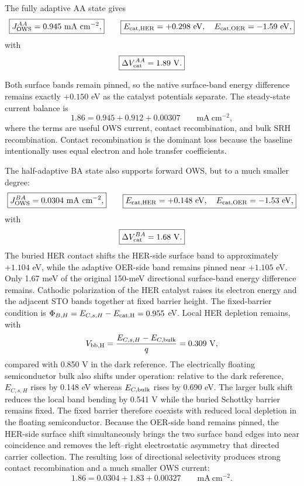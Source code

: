 \documentclass[11pt]{article}
\begin{document}
The fully adaptive AA state gives
\begin{equation}
\boxed{J_{\rm OWS}^{AA}=0.945~\mathrm{mA~cm^{-2}},}\qquad
\boxed{E_{\rm cat,HER}=+0.298~\mathrm{eV},\quad E_{\rm cat,OER}=-1.59~\mathrm{eV},}
\end{equation}
with
\begin{equation}
\boxed{\Delta V_{\rm cat}^{AA}=1.89~\mathrm V.}
\end{equation}


Both surface bands remain pinned, so the native surface-band energy difference remains exactly $+0.150$ eV as the catalyst potentials separate. The steady-state current balance is
\begin{equation}
1.86=0.945+0.912+0.00307
\qquad \mathrm{mA~cm^{-2}},
\label{eq:aa-balance}
\end{equation}
where the terms are useful OWS current, contact recombination, and bulk SRH recombination. Contact recombination is the dominant loss because the baseline intentionally uses equal electron and hole transfer coefficients.

The half-adaptive BA state also supports forward OWS, but to a much smaller degree:
\begin{equation}
\boxed{J_{\rm OWS}^{BA}=0.0304~\mathrm{mA~cm^{-2}},}\qquad
\boxed{E_{\rm cat,HER}=+0.148~\mathrm{eV},\quad E_{\rm cat,OER}=-1.53~\mathrm{eV},}
\end{equation}
with
\begin{equation}
\boxed{\Delta V_{\rm cat}^{BA}=1.68~\mathrm V.}
\end{equation}
The buried HER contact shifts the HER-side surface band to approximately $+1.104$ eV, while the adaptive OER-side band remains pinned near $+1.105$ eV. Only 1.67 meV of the original 150-meV directional surface-band energy difference remains. Cathodic polarization of the HER catalyst raises its electron energy and the adjacent STO bands together at fixed barrier height. The fixed-barrier condition is $\Phi_{B,H}=E_{C,s,H}-E_{\rm cat,H}=0.955$ eV. Local HER depletion remains, with
\[
V_{\rm bb,H}=\frac{E_{C,s,H}-E_{C,\rm bulk}}{q}=0.309~\mathrm V,
\]
compared with 0.850 V in the dark reference. The electrically floating semiconductor bulk also shifts under operation: relative to the dark reference, $E_{C,s,H}$ rises by 0.148 eV whereas $E_{C,\rm bulk}$ rises by 0.690 eV. The larger bulk shift reduces the local band bending by 0.541 V while the buried Schottky barrier remains fixed. The fixed barrier therefore coexists with reduced local depletion in the floating semiconductor. Because the OER-side band remains pinned, the HER-side surface shift simultaneously brings the two surface band edges into near coincidence and removes the left--right electrostatic asymmetry that directed carrier collection. The resulting loss of directional selectivity produces strong contact recombination and a much smaller OWS current:
\begin{equation}
1.86=0.0304+1.83+0.00327
\qquad \mathrm{mA~cm^{-2}}.
\label{eq:ba-balance}
\end{equation}
\end{document}
